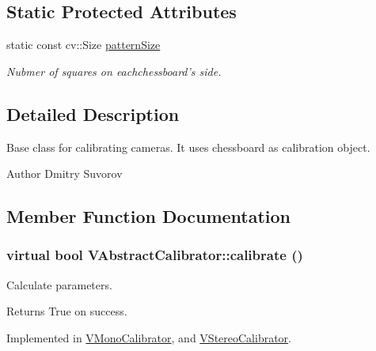 \subsection*{Static Protected Attributes}
\begin{DoxyCompactItemize}
\item 
\hypertarget{classVAbstractCalibrator_ab9d3983a50f6314e1702a245eea9c8d0}{
static const cv::Size \hyperlink{classVAbstractCalibrator_ab9d3983a50f6314e1702a245eea9c8d0}{patternSize}}
\label{classVAbstractCalibrator_ab9d3983a50f6314e1702a245eea9c8d0}

\begin{DoxyCompactList}\small\item\em Nubmer of squares on eachchessboard's side. \item\end{DoxyCompactList}\end{DoxyCompactItemize}


\subsection{Detailed Description}
Base class for calibrating cameras. It uses chessboard as calibration object.

\begin{DoxyAuthor}{Author}
Dmitry Suvorov 
\end{DoxyAuthor}


\subsection{Member Function Documentation}
\hypertarget{classVAbstractCalibrator_a7251a0da257534695adcec223d467835}{
\subsubsection[{calibrate}]{\setlength{\rightskip}{0pt plus 5cm}virtual bool VAbstractCalibrator::calibrate ()}}
\label{classVAbstractCalibrator_a7251a0da257534695adcec223d467835}
Calculate parameters. \begin{DoxyReturn}{Returns}
True on success. 
\end{DoxyReturn}


Implemented in \hyperlink{classVMonoCalibrator_a16cdc1f9c47d6437a124bd5f5a4ec426}{VMonoCalibrator}, and \hyperlink{classVStereoCalibrator_a7754bdddf997110220fedb2a222001ee}{VStereoCalibrator}.


